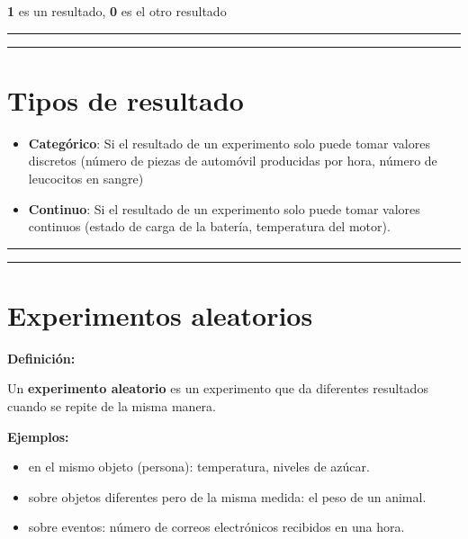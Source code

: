 \documentclass[
]{book}
\providecommand{\tightlist}{%
  \setlength{\itemsep}{0pt}\setlength{\parskip}{0pt}}
\begin{document}
\textbf{1} es un resultado, \textbf{0} es el otro resultado

\begin{center}\rule{0.5\linewidth}{0.5pt}\end{center}

\begin{center}\rule{0.5\linewidth}{0.5pt}\end{center}

\hypertarget{tipos-de-resultado}{%
\section{Tipos de resultado}\label{tipos-de-resultado}}

\begin{itemize}
\tightlist
\item
  \textbf{Categórico}: Si el resultado de un experimento solo puede tomar valores discretos (número de piezas de automóvil producidas por hora, número de leucocitos en sangre)
\end{itemize}

\begin{itemize}
\tightlist
\item
  \textbf{Continuo}: Si el resultado de un experimento solo puede tomar valores continuos (estado de carga de la batería, temperatura del motor).
\end{itemize}

\begin{center}\rule{0.5\linewidth}{0.5pt}\end{center}

\begin{center}\rule{0.5\linewidth}{0.5pt}\end{center}

\hypertarget{experimentos-aleatorios}{%
\section{Experimentos aleatorios}\label{experimentos-aleatorios}}

\textbf{Definición:}

Un \textbf{experimento aleatorio} es un experimento que da diferentes resultados cuando se repite de la misma manera.

\textbf{Ejemplos:}

\begin{itemize}
\tightlist
\item
  en el mismo objeto (persona): temperatura, niveles de azúcar.
\item
  sobre objetos diferentes pero de la misma medida: el peso de un animal.
\item
  sobre eventos: número de correos electrónicos recibidos en una hora.
\end{itemize}
\end{document}

